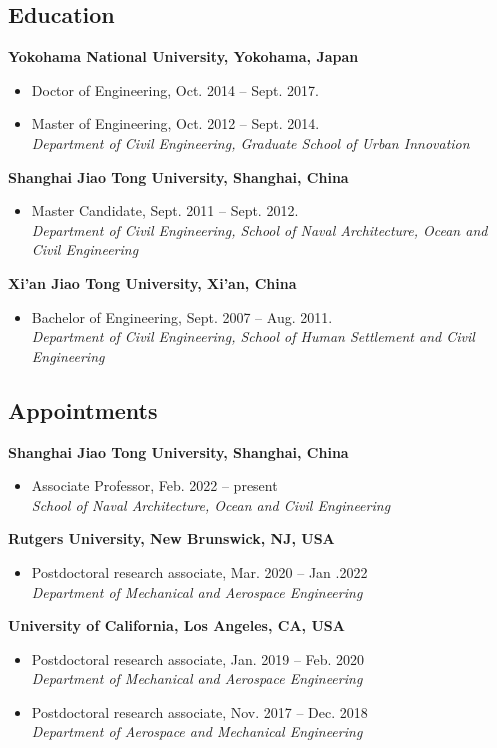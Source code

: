 \documentclass[10pt]{article}
\newenvironment{myitemize}
{ \begin{itemize}
    \setlength{\itemsep}{0pt}
    \setlength{\parskip}{0pt}
    \setlength{\parsep}{0pt}     }
{ \end{itemize}                  }
\begin{document}
\subsection*{Education}

{\bf\color{Blue} Yokohama National University, Yokohama, Japan}		
\begin{myitemize}
\item Doctor of Engineering, Oct. 2014 -- Sept. 2017.
\item Master of Engineering, Oct. 2012 -- Sept. 2014.\\
\textit{Department of Civil Engineering, Graduate School of Urban Innovation}
\end{myitemize}
{\bf\color{Blue} Shanghai Jiao Tong University, Shanghai, China}
\begin{myitemize}
\item Master Candidate, Sept. 2011 -- Sept. 2012.\\
\textit{Department of Civil Engineering, School of Naval Architecture, Ocean and Civil Engineering}
\end{myitemize}
{\bf\color{Blue} Xi'an Jiao Tong University, Xi'an, China}
\begin{myitemize}
\item Bachelor of Engineering, Sept. 2007 -- Aug. 2011.\\
\textit{Department of Civil Engineering, School of Human Settlement and Civil Engineering}
\end{myitemize}

\subsection*{Appointments}

{\bf \color{Blue} Shanghai Jiao Tong University, Shanghai, China} 
\begin{myitemize}
\item Associate Professor, Feb. 2022 -- present \\
{\em School of Naval Architecture, Ocean and Civil Engineering}
\end{myitemize}
{\bf \color{Blue} Rutgers University, New Brunswick, NJ, USA} 
\begin{myitemize}
\item  Postdoctoral research associate, Mar. 2020 -- Jan .2022\\
{\em Department of Mechanical and Aerospace Engineering}
\end{myitemize}
{\bf \color{Blue} University of California, Los Angeles, CA, USA} 
\begin{myitemize}
\item  Postdoctoral research associate, Jan. 2019 -- Feb. 2020\\
{\em Department of Mechanical and Aerospace Engineering}
\end{myitemize}
\begin{myitemize}
\item Postdoctoral research associate, Nov. 2017 -- Dec. 2018 \\
{\em Department of Aerospace and Mechanical Engineering}
\end{myitemize}
\end{document}
